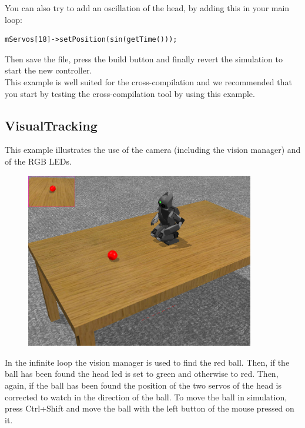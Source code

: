 \documentclass[a4paper, 12pt]{article}  		%
\begin{document}
You can also try to add an oscillation of the head, by adding this in your main loop:
\lstset{language=c++} 
\lstset{commentstyle=\textit} 
\begin{lstlisting} 
mServos[18]->setPosition(sin(getTime()));
\end{lstlisting}

Then save the file, press the build button and finally revert the simulation to start the new controller.\\

This example is well suited for the cross-compilation and we recommended that you start by testing the cross-compilation tool by using this example.\\

\newpage
\subsection{VisualTracking}

This example illustrates the use of the camera (including the vision manager) and of the RGB LEDs.\\

\begin{figure}[H]
\begin{center}
\includegraphics[width=10cm]{example_visualTracking.png}
\label{example_visualTracking.png}
\end{center}
\end{figure}

In the infinite loop the vision manager is used to find the red ball. 
Then, if the ball has been found the head led is set to green and otherwise to red.
Then, again, if the ball has been found the position of the two servos of the head is corrected to watch in the direction of the ball. To move the ball in simulation, press Ctrl+Shift and move the ball with the left button of the mouse pressed on it.\\
\end{document}

